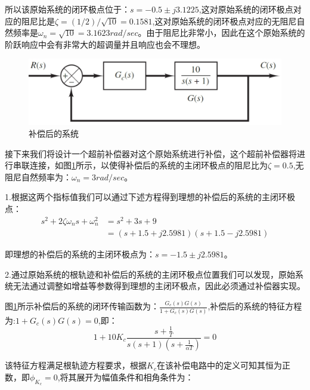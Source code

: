 \documentclass{article}
\numberwithin{equation}{section}
\numberwithin{figure}{section}
\begin{document}
所以该原始系统的闭环极点位于：$s=-0.5\pm j3.1225$,这对原始系统的闭环极点对应的阻尼比是$\zeta = (1/2)/\sqrt{10}=0.1581$,这对原始系统的闭环极点对应的无阻尼自然频率是$\omega_n=\sqrt{10}=3.1623rad/sec$。由于阻尼比非常小，因此在这个原始系统的阶跃响应中会有非常大的超调量并且响应也会不理想。

\begin{figure}
    \centering
    \includegraphics[width=.6\textwidth]{Chapter6/ExampleofLeadCompensation_post-compensatedsystem.png} %
    \caption{补偿后的系统} %
    \label{ExampleofLeadCompensation_post-compensatedsystem} %
\end{figure}

接下来我们将设计一个超前补偿器对这个原始系统进行补偿，这个超前补偿器将进行串联连接，如图\ref{ExampleofLeadCompensation_post-compensatedsystem}所示，以使得补偿后的系统的主闭环极点的阻尼比为$\zeta=0.5$,无阻尼自然频率为：$\omega_n=3rad/sec$。

1.根据这两个指标值我们可以通过下述方程得到理想的补偿后的系统的主闭环极点：
\begin{equation}
    \begin{split}
        s^2+2\zeta \omega_ns+\omega_n^2&=s^2+3s+9\\
        &=(s+1.5+j2.5981)(s+1.5-j2.5981)
    \end{split}
\end{equation}

即理想的补偿后的系统的主闭环极点为：$s=-1.5\pm j2.5981$。

2.通过原始系统的根轨迹和补偿后的系统的主闭环极点位置我们可以发现，原始系统无法通过调整如增益等参数得到理想的主闭环极点，因此必须通过补偿器实现。

图\ref{ExampleofLeadCompensation_post-compensatedsystem}所示补偿后的系统的闭环传输函数为：$\frac{G_c(s)G(s)}{1+G_c(s)G(s)}$,补偿后的系统的特征方程为:$1+G_c(s)G(s)=0$,即：
\begin{equation}
    1+10K_c\frac{s+\frac{1}{T}}{s(s+1)(s+\frac{1}{\alpha T})}=0
\end{equation}

该特征方程满足根轨迹方程要求，根据$K_c$在该补偿电路中的定义可知其恒为正数，即$\phi_{K_c}=0$,将其展开为幅值条件和相角条件为：
\end{document}
